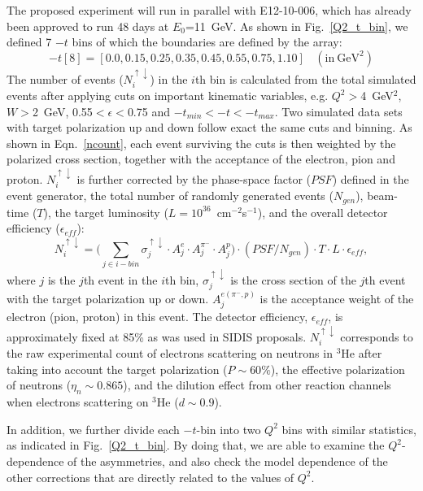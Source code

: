 The proposed experiment will run in parallel with E12-10-006, which has already
been approved to run 48 days at $E_{0}$=11~GeV.  As shown in
Fig.~\ref{Q2_t_bin}, we defined 7 $-t$ bins of which the boundaries are
defined by the array:
 \begin{equation}
-t[8] = [0.0, 0.15, 0.25, 0.35, 0.45, 0.55, 0.75, 1.10]~~~~(\mathrm{in~GeV^{2}})
 \end{equation}
The number of events ($N^{\uparrow\downarrow}_{i}$) in the $i$th bin is calculated from the total
simulated events after applying cuts on important kinematic variables,
e.g. $Q^{2}>$4~GeV$^{2}$, $W>$2~GeV, 0.55$<\epsilon<$0.75 and
$-t_{min}<-t<-t_{max}$. Two simulated data sets with target polarization up and down follow exact the same cuts and binning. 
As shown in Eqn.~\ref{ncount}, each event surviving the
cuts is then weighted by the polarized cross section, together with the
acceptance of the electron, pion and proton. $N^{\uparrow\downarrow}_{i}$ is further corrected by
the phase-space factor ($PSF$) defined in the event generator, the total number
of randomly generated events ($N_{gen}$), beam-time ($T$), the target
luminosity ($L=10^{36}$~cm$^{-2}$s$^{-1}$), and the overall detector efficiency 
($\epsilon_{eff}$):
 \begin{equation}
     N^{\uparrow\downarrow}_{i} = \bigl(\sum_{j\in i-bin} \sigma^{\uparrow\downarrow}_{j}\cdot A^{e}_{j} \cdot
     A^{\pi^{-}}_{j} \cdot A^{p}_{j}\bigr) \cdot (PSF/N_{gen}) \cdot T \cdot L \cdot  \epsilon_{eff},
     \label{ncount}
 \end{equation}
where $j$ is the $j$th event in the $i$th bin, $\sigma^{\uparrow\downarrow}_{j}$ is the cross
section of the $j$th event with the target polarization up or down. $A^{e(\pi^{-},p)}_{j}$ is the acceptance weight of the
electron (pion, proton) in this event. The detector efficiency,
$\epsilon_{eff}$, is approximately fixed at 85\% as was used in SIDIS
proposals. $N^{\uparrow\downarrow}_{i}$ corresponds to the raw experimental count of electrons
scattering on neutrons in $\mathrm{^{3}He}$ after taking into account the
target polarization ($P\sim60\%$), the effective polarization of neutrons
($\eta_{n}\sim0.865$), and the dilution effect from other reaction channels
when electrons scattering on $\mathrm{^{3}He}$ ($d \sim 0.9$). 

In addition, we further divide each $-t$-bin into two $Q^{2}$ bins with similar
statistics, as indicated in Fig.~\ref{Q2_t_bin}.  By doing that, we are able to examine the $Q^{2}$-dependence of the
asymmetries, and also check the model dependence of the other corrections that
are directly related to the values of $Q^{2}$.


